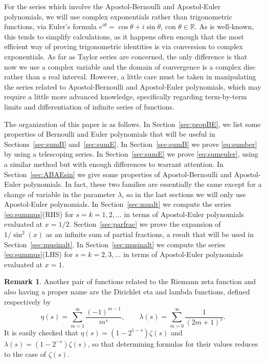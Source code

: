 \documentclass[11pt, oneside]{article}
\newcommand{\R}{\mathbb{R}}
\theoremstyle{plain}
\theoremstyle{definition}
\newtheorem{remark}[theorem]{Remark}
\begin{document}
For the series which involve the Apostol-Bernoulli and Apostol-Euler polynomials, we will use complex exponentials rather than trigonometric functions, via Euler's formula $e^{i\theta} = \cos\theta+i\sin\theta$, con $\theta \in \R$. As is well-known, this tends to simplify calculations, as it happens often enough that the most efficient way of proving trigonometric identities is via conversion to complex exponentials. 
As far as Taylor series are concerned, the only difference is that now we use a complex variable and the domain of convergence is a complex disc rather than a real interval. 
However, a little care must be taken in manipulating the series related to Apostol-Bernoulli and Apostol-Euler polynomials, which may require a little more advanced knowledge, specifically regarding term-by-term limits and differentiation of infinite series of functions.

The organization of this paper is as follows. In Section~\ref{sec:propBE}, we list some properties of Bernoulli and Euler polynomials that will be useful in Sections~\ref{sec:sumB} and~\ref{sec:sumE}. In Section~\ref{sec:sumB} we prove \eqref{eq:sumber} by using a telescoping series.
In Section~\ref{sec:sumE} we prove \eqref{eq:sumeuler}, using a similar method but with enough differences to warrant attention. In Section~\ref{sec:ABAEsin} we give some properties of Apostol-Bernoulli and Apostol-Euler polynomials. In fact, these two families are essentially the same except for a change of variable in the parameter $\lambda$, so in the last sections we will only use Apostol-Euler polynomials. In Section~\ref{sec:mualt} we compute the series \eqref{eq:summus}(RHS) for $s=k=1,2,\dots$ in terms of Apostol-Euler polynomials evaluated at $x=1/2$. 
Section~\ref{sec:parfrac} we prove the expansion of $1/\sin^2(x)$ as an infinite sum of partial fractions, a result that will be used in Section~\ref{sec:musinalt}.
In Section~\ref{sec:musinalt} we compute the series \eqref{eq:summus}(LHS) for $s=k=2,3,\dots$ in terms of Apostol-Euler polynomials evaluated at $x=1$.

\begin{remark}
Another pair of functions related to the Riemann zeta function and also having a proper name are the Dirichlet eta and lambda functions, defined respectively by
\[
  \eta(s) = \sum_{m=1}^\infty \frac{(-1)^{m-1}}{m^s},
  \qquad
  \lambda(s) = \sum_{m=0}^\infty \frac{1}{(2m+1)^s}.
\]
It is easily checked that $\eta(s) = (1-2^{1-s})\zeta(s)$ and $\lambda(s) = (1-2^{-s})\zeta(s)$, so that determining formulas for their values reduces to the case of $\zeta(s)$.
\end{remark}
\end{document}
